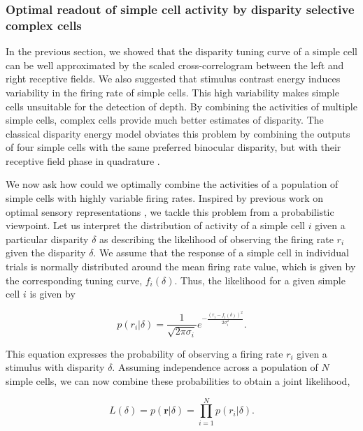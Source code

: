 

\subsubsection*{Optimal readout of simple cell activity by disparity selective complex cells}

In the previous section, we showed that the disparity tuning curve of a simple cell can be well approximated by the scaled cross-correlogram between the left and right receptive fields. We also suggested that stimulus contrast energy induces variability in the firing rate of simple cells. This high variability makes simple cells unsuitable for the detection of depth. By combining the activities of multiple simple cells, complex cells provide much better estimates of disparity. The classical disparity energy model obviates this problem by combining the outputs of four simple cells with the same preferred binocular disparity, but with their receptive field phase in quadrature \cite{Ohzawa:1990cq}. 

We now ask how could we optimally combine the activities of a population of simple cells with highly variable firing rates. Inspired by previous work on optimal sensory representations \cite{Jazayeri:2006fk}, we tackle this problem from a probabilistic viewpoint. Let us interpret the distribution of activity of a simple cell $i$ given a particular disparity $\delta$ as describing the likelihood of observing the firing rate $r_i$ given the disparity $\delta$. We assume that the response of a simple cell in individual trials is normally distributed around the mean firing rate value, which is given by the corresponding tuning curve, $f_i(\delta)$. Thus, the likelihood for a given simple cell $i$ is given by

\begin{equation}
  p(r_i | \delta) = \frac{1}{\sqrt{2 \pi \sigma_i}} e^{- \frac{(r_i-f_i(\delta))^2}{2 \sigma_i^2}}.
\end{equation}

This equation expresses the probability of observing a firing rate $r_i$ given a stimulus with disparity $\delta$. Assuming independence across a population of $N$ simple cells, we can now combine these probabilities to obtain a joint likelihood,

\begin{equation}
 L(\delta) = p(\mathbf{r} | \delta) = \prod_{i=1}^N p(r_i| \delta) .
\label{eq:JointLikelihood}
\end{equation}
 
